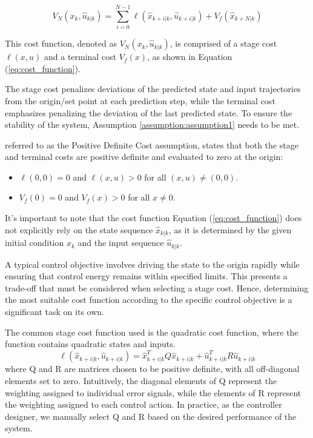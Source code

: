 \begin{equation}\label{eq:cost_function}
    V_N(x_k,\hat{u}_{k|k}) = \sum_{i=0}^{N-1} \ell(\hat{x}_{k+i|k}, \hat{u}_{k+i|k}) + V_f(\hat{x}_{k+N|k})
\end{equation}

This cost function, denoted as $V_N(x_k,\hat{u}_{k|k})$, is comprised of a stage cost $\ell(x,u)$ and a terminal cost $V_f(x)$, as shown in Equation (\ref{eq:cost_function}).

The stage cost penalizes deviations of the predicted state and input trajectories from the origin/set point at each prediction step, while the terminal cost emphasizes penalizing the deviation of the last predicted state. To ensure the stability of the system, Assumption \ref{assumption:assumption1} needs to be met.


\begin{assumption} \label{assumption:assumption1}
    referred to as the Positive Definite Cost assumption, states that both the stage and terminal costs are positive definite and evaluated to zero at the origin:
\begin{itemize}
    \item $\ell(0,0) = 0$ and $\ell(x,u) > 0$ for all $(x,u) \neq (0,0)$.
    \item $V_f(0) = 0$ and $V_f(x) > 0$ for all $x \neq 0$.
\end{itemize}
\end{assumption} 


It's important to note that the cost function Equation (\ref{eq:cost_function}) does not explicitly rely on the state sequence $\hat{x}_{k|k}$, as it is determined by the given initial condition $x_k$ and the input sequence $\hat{u}_{k|k}$.

A typical control objective involves driving the state to the origin rapidly while ensuring that control energy remains within specified limits. This presents a trade-off that must be considered when selecting a stage cost. Hence, determining the most suitable cost function according to the specific control objective is a significant task on its own.

The common stage cost function used is the quadratic cost function, where the function contains quadratic states and inputs. 
\begin{equation}\label{eq:quadratic cost function}
   \ell(\hat{x}_{k+i|k}, \hat{u}_{k+i|k}) =  \hat{x}_{k+i|k}^T Q \hat{x}_{k+i|k} + \hat{u}_{k+i|k}^T R \hat{u}_{k+i|k}
\end{equation}
where Q and R are matrices chosen to be positive definite, with all off-diagonal elements set to zero. Intuitively, the diagonal elements of Q represent the weighting assigned to individual error signals, while the elements of R represent the weighting assigned to each control action. In practice, as the controller designer, we manually select Q and R based on the desired performance of the system.

